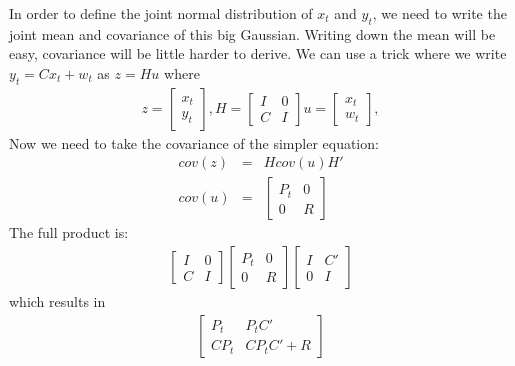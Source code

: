 \documentclass[a4paper,11pt]{article}
\begin{document}
In order to define the joint normal distribution of $x_{t}$ and $y_{t}$, we need
to write the joint mean and covariance of this big Gaussian. Writing down the
mean will be easy, covariance will be little harder to derive. We can use a
trick \cite{lall} where we write $y_{t} = Cx_{t} + w_t$ as $z = Hu$
where
\begin{eqnarray*}
z =   \left[ \begin{array}{c}
      x_{t} \\
      y_{t}
      \end{array} \right],
H =   \left[ \begin{array}{cc}
      I & 0 \\
      C & I
      \end{array} \right]
u =   \left[ \begin{array}{c}
      x_{t} \\
      w_t
      \end{array} \right],      
\end{eqnarray*}
Now we need to take the covariance of the simpler equation:
\begin{eqnarray*}
cov(z) &=& H cov(u) H'\\
cov(u) &=& \left[ \begin{array}{cc}
      P_{t} & 0 \\
      0 & R
      \end{array} \right]     
\end{eqnarray*}
The full product is:
\begin{eqnarray*}
\left[ \begin{array}{cc}
      I & 0 \\
      C & I
      \end{array} \right]
\left[ \begin{array}{cc}
      P_{t} & 0 \\
      0 & R
      \end{array} \right]
\left[ \begin{array}{cc}
      I & C' \\
      0 & I
      \end{array} \right]           
\end{eqnarray*}
which results in
\begin{eqnarray*}
\left[ \begin{array}{cc}
      P_{t} & P_{t}C' \\
      CP_{t} & CP_{t}C'+R
      \end{array} \right]           
\end{eqnarray*}
\end{document}
